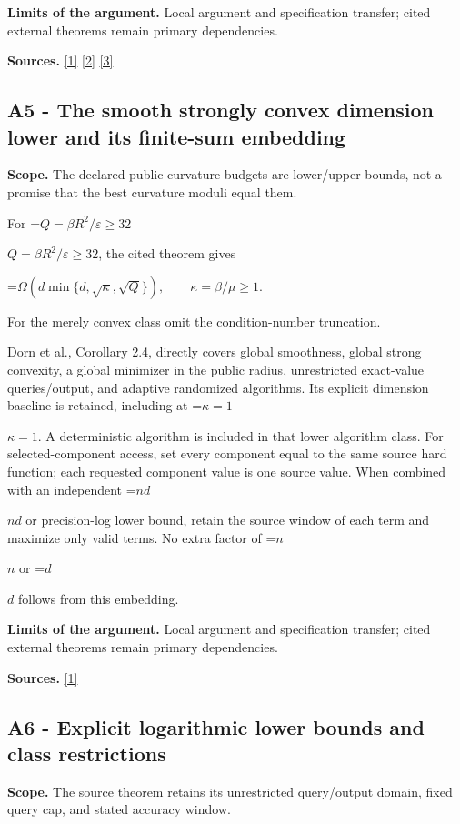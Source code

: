 \documentclass[10pt,a4paper]{article}
\newcommand{\AtlasMath}[1]{\par\begingroup\centering\setbox0=\hbox{$\displaystyle #1$}\ifdim\wd0>1.4\linewidth\typeout{ATLAS WIDE FORMULA: \the\wd0}\fi\ifdim\wd0>\linewidth\resizebox{\linewidth}{!}{\box0}\else\box0\fi\par\endgroup}
\newcommand{\AtlasInlineMath}[1]{\begingroup\setbox0=\hbox{$#1$}\ifdim\wd0>.4\linewidth\endgroup\AtlasMath{#1}\else\endgroup$#1$\fi}
\begin{document}
\textbf{Limits of the argument.} Local argument and specification transfer; cited external theorems remain primary dependencies.

\textbf{Sources.} \href{https://arxiv.org/html/2610.00345v1}{[1]} \href{https://arxiv.org/abs/2109.08858}{[2]} \href{https://arxiv.org/html/2607.16558v2}{[3]}

\subsection{A5 - The smooth strongly convex dimension lower and its finite-sum embedding}
\textbf{Scope.} The declared public curvature budgets are lower/upper bounds, not a promise that the best curvature moduli equal them.

For \AtlasInlineMath{Q=\beta R^2/\varepsilon\ge32}, the cited theorem gives

\AtlasMath{\Omega\!\left(d\min\{d,\sqrt\kappa,\sqrt Q\}\right),\qquad\kappa=\beta/\mu\ge1.}

For the merely convex class omit the condition-number truncation.

Dorn et al., Corollary 2.4, directly covers global smoothness, global strong convexity, a global minimizer in the public radius, unrestricted exact-value queries/output, and adaptive randomized algorithms. Its explicit dimension baseline is retained, including at \AtlasInlineMath{\kappa=1}. A deterministic algorithm is included in that lower algorithm class. For selected-component access, set every component equal to the same source hard function; each requested component value is one source value. When combined with an independent \AtlasInlineMath{nd} or precision-log lower bound, retain the source window of each term and maximize only valid terms. No extra factor of \AtlasInlineMath{n} or \AtlasInlineMath{d} follows from this embedding.

\textbf{Limits of the argument.} Local argument and specification transfer; cited external theorems remain primary dependencies.

\textbf{Sources.} \href{https://arxiv.org/html/2610.00345v1}{[1]}

\subsection{A6 - Explicit logarithmic lower bounds and class restrictions}
\textbf{Scope.} The source theorem retains its unrestricted query/output domain, fixed query cap, and stated accuracy window.
\end{document}
